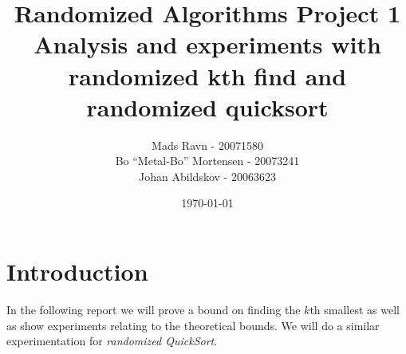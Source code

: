\documentclass[article,a4paper,oneside]{memoir}
\newcommand{\+}[1]{\ensuremath{\boldsymbol{#1}}}
\begin{document}
\title{
Randomized Algorithms Project 1\\
Analysis and experiments with randomized kth find and randomized quicksort
}

\author{
  Mads Ravn - 20071580\\
  Bo ``Metal-Bo'' Mortensen - 20073241\\
  Johan Abildskov - 20063623
}

\date{\today}

\maketitle

\newpage

\tableofcontents*


\chapter{Introduction}
In the following report we will prove a bound on finding the $k$th smallest as well as show experiments relating to the theoretical bounds. We will do a similar experimentation for \emph{randomized QuickSort}.
\end{document}
